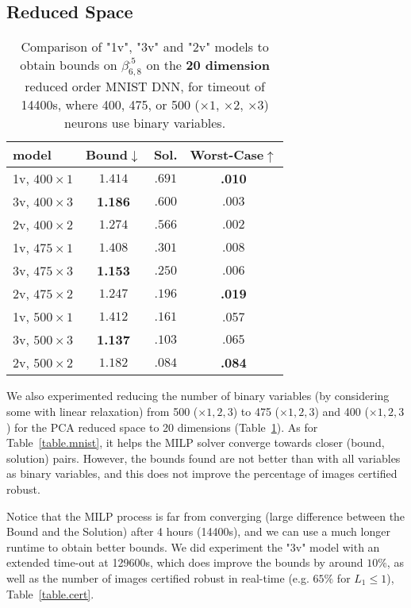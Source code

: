 \subsection{Reduced Space}

\begin{table}[h!]
	\centering
	\begin{tabular}{||l||c|c|c||}\hline\hline
		model &        Bound$\downarrow$ &  Sol. &      Worst-Case$\uparrow$ \\\hline \hline
1v, $400 \times 1$ & $1.414$ &  $.691$ & {\bf .010} \\\hline 
3v, $400 \times 3$ & {\bf 1.186} & $.600$ & $.003$ \\\hline 
2v, $400 \times 2$ & $1.274$ & $.566$ & $.002$ \\\hline\hline
	 
1v, $475 \times 1$ &  $1.408$ & $.301$ & $.008$  \\\hline 
3v, $475 \times 3$ &  {\bf 1.153} & $.250$ & $.006$ \\ \hline 
2v, $475 \times 2$ &  $1.247$ & $.196$ & {\bf .019} \\\hline\hline

1v, $500 \times 1$ & $1.412$ & $.161$ & .057 \\\hline 
3v, $500 \times 3$ & {\bf 1.137} & $.103$ & $.065$\\\hline 
2v, $500 \times 2$ &  $1.182$ & $.084$& {\bf .084}  \\\hline\hline
	 
	\end{tabular}
	\caption{Comparison of "1v", "3v" and "2v" models 
	to obtain bounds on $\beta^{.5}_{6,8}$ on the {\bf 20 dimension} reduced order MNIST DNN, for timeout of 14400s, 
	where 400, 475,  or 500 ($\times 1$, $\times 2$, $\times 3$) neurons use binary variables.}
	\label{table.reduced}
\end{table}


We also experimented reducing the number of binary variables (by considering some with linear relaxation) from 500 ($\times 1,2,3$) to 475 ($\times 1,2,3$) and 400 ($\times 1,2,3$) for the PCA reduced space to 20 dimensions (Table~\ref{table.reduced}). 
As for Table~\ref{table.mnist}, it helps the MILP solver converge towards closer (bound, solution) pairs. However, the bounds found are not better than with all variables as binary variables, and this does not improve the percentage of images certified robust.


Notice that the MILP process is far from converging (large difference between the Bound and the Solution) after 4 hours (14400s), and we can use a much longer 
runtime to obtain better bounds. We did experiment the "3v" model with an extended time-out at 129600s, which does improve the bounds by around $10\%$, as well as the number of images certified robust in real-time (e.g. $65\%$ for $L_1 \leq 1$), Table~\ref{table.cert}.


